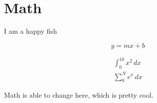 \section{Math}
I am a happy fish

\begin{equation}
	y = mx + b
\end{equation}

\begin{gather}
	\int_{0}^{10} x^2 \,dx \\
	\sum_{0}^{N} e^x \,dx
\end{gather}

Math is able to change here, which is pretty cool.